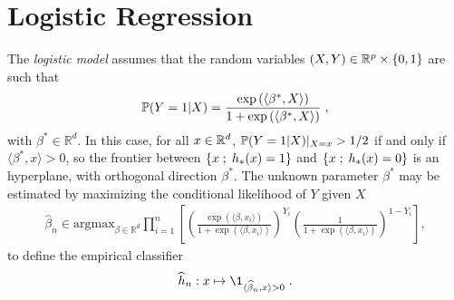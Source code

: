 \section{Logistic Regression}
The \emph{logistic model} assumes that the random variables  $(X,Y)\in \mathbb{R}^p\times\{0,1\}$ are such that
\begin{equation}\label{eq:logistic}
\mathbb{P}(Y=1|X)={\exp\left(\langle \beta^*,X\rangle\right)\over 1+\exp\left(\langle \beta^*,X\rangle\right)}\;,
\end{equation}
with $\beta^*\in\mathbb{R}^d$. In this case, for all $x\in\mathbb{R}^d$, $\mathbb{P}(Y=1|X)|_{X=x}>1/2$ if and only if $\langle \beta^*,x\rangle>0$, so
the frontier between $\left\{x\;;\; h_{*}(x)=1\right\}$ and $\left\{x\; ;\; h_{*}(x)=0\right\}$ is an hyperplane, with orthogonal
direction $\beta^*$. The unknown parameter $\beta^*$ may be estimated  by maximizing the conditional likelihood of $Y$ given $X$
\begin{align*}
\widehat \beta_n\in\mathrm{argmax}_{\beta\in\mathbb{R}^{d}}
\prod_{i=1}^n \left[ \left( \frac{\exp\left(\langle
	\beta,x_{i}\rangle\right)}{1+\exp\left(\langle
	\beta,x_{i}\rangle\right)}\right)^{Y_{i}}
\left(\frac{1}{1+\exp\left(\langle
	\beta,x_{i}\rangle\right)}\right)^{1- Y_{i}} \right] ,
\end{align*}
to define the empirical classifier
\[
\widehat h_{n}: x \mapsto \1_{\langle \widehat\beta_n,x\rangle>0}\eqsp.
\]
